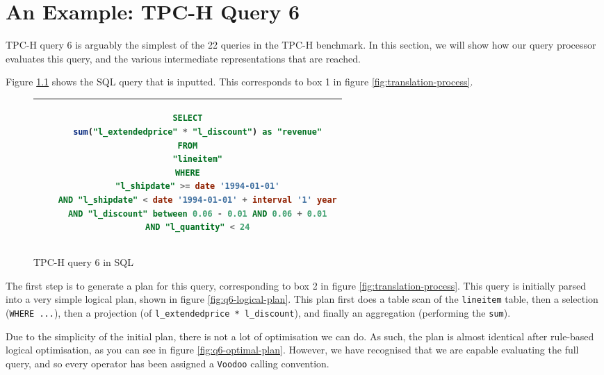 \appendix

\chapter{An Example: TPC-H Query 6}
\label{appendix:full-query}

TPC-H query 6 is arguably the simplest of the 22 queries in the TPC-H benchmark. In this section, we will show how our query processor evaluates this query, and the various intermediate representations that are reached.

Figure \ref{fig:q6-sql} shows the SQL query that is inputted. This corresponds to box 1 in figure \ref{fig:translation-process}.

\begin{figure}[H]
    \centering
    \begin{tabular}{|c|}
    \hline
    \begin{lstlisting}[language=SQL]
SELECT
    sum("l_extendedprice" * "l_discount") as "revenue"
FROM
    "lineitem"
WHERE
    "l_shipdate" >= date '1994-01-01'
    AND "l_shipdate" < date '1994-01-01' + interval '1' year
    AND "l_discount" between 0.06 - 0.01 AND 0.06 + 0.01
    AND "l_quantity" < 24
    \end{lstlisting} \\
    \hline
    \end{tabular}
    \caption{TPC-H query 6 in SQL}
    \label{fig:q6-sql}
\end{figure}

\newpage

The first step is to generate a plan for this query, corresponding to box 2 in figure \ref{fig:translation-process}. This query is initially parsed into a very simple logical plan, shown in figure \ref{fig:q6-logical-plan}. This plan first does a table scan of the \texttt{lineitem} table, then a selection (\texttt{WHERE ...}), then a projection (of \texttt{l\_extendedprice * l\_discount}), and finally an aggregation (performing the \texttt{sum}).

Due to the simplicity of the initial plan, there is not a lot of optimisation we can do. As such, the plan is almost identical after rule-based logical optimisation, as you can see in figure \ref{fig:q6-optimal-plan}. However, we have recognised that we are capable evaluating the full query, and so every operator has been assigned a \texttt{Voodoo} calling convention.

